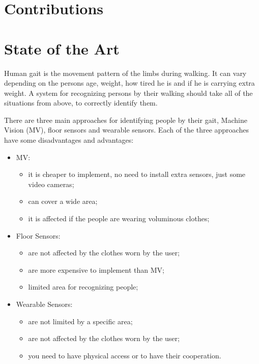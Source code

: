\documentclass[12pt]{article}
\theoremstyle{definition}
\begin{document}
	\newpage
	
	\section{Contributions}
	\vspace{1cm}
	
	\newpage
	
	\section{State of the Art}
	\vspace{1cm}
	
	Human gait is the movement pattern of the limbs during walking. It can vary depending on the persons age, weight, how tired he is and if he is carrying extra weight. A system for recognizing persons by their walking should take all of the situations from above, to correctly identify them.
	
	There are three main approaches for identifying people by their gait, Machine Vision (MV), floor sensors and wearable sensors. Each of the three approaches have some disadvantages and advantages:
		\begin{itemize}
			\item MV:
				\begin{itemize}
					\item it is cheaper to implement, no need to install extra sensors, just some video cameras;
					\item can cover a wide area;
					\item it is affected if the people are wearing voluminous clothes;
				\end{itemize}
			\item Floor Sensors:
				\begin{itemize}
					\item are not affected by the clothes worn by the user;
					\item are more expensive to implement than MV;
					\item limited area for recognizing people;
				\end{itemize}
			\item Wearable Sensors:
				\begin{itemize}
					\item are not limited by a specific area;
					\item are not affected by the clothes worn by the user;
					\item you need to have physical access or to have their cooperation.
				\end{itemize}
		\end{itemize}
	
\end{document}
